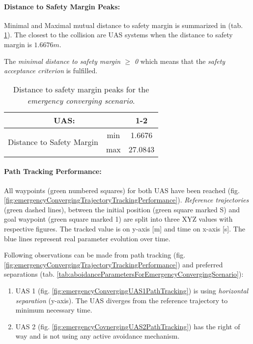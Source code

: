 \paragraph{Distance to Safety Margin Peaks:} Minimal and Maximal mutual distance to safety margin is summarized in (tab. \ref{tab:testCaseEmergencyConvergingSafetyMarginDistances}). The closest to the collision are UAS systems when the distance to safety margin is $1.6676m$.

The \emph{minimal distance to safety margin  $\ge$ 0} which means that the \emph{safety acceptance criterion} is fulfilled. 

\begin{table}[H]
    \centering
    \begin{tabular}{c|c||c}
    \multicolumn{2}{c||}{UAS:} & 1-2 \\\hline\hline
    \multirow{2}{*}{Distance to Safety Margin} & min & 1.6676 \\\cline{2-3}
                                            & max & 27.0843 \\
    \end{tabular}
    \caption{Distance to safety margin peaks for the \emph{emergency converging scenario}.}
    \label{tab:testCaseEmergencyConvergingSafetyMarginDistances}
\end{table}

\paragraph{Path Tracking Performance:} All waypoints (green numbered squares) for both  UAS have been reached (fig. \ref{fig:emergencyConvergingTrajectoryTrackingPerformance}). \emph{Reference trajectories} (green dashed lines), between the initial position (green square marked S) and goal waypoint (green square marked 1) are split into three XYZ values with respective figures. The tracked value is on y-axis [m] and time on x-axis [s]. The blue lines represent real parameter evolution over time.

Following observations can be made from path tracking (fig. \ref{fig:emergencyConvergingTrajectoryTrackingPerformance}) and preferred separations (tab. \ref{tab:aboidanceParametersForEmergencyConvergingScenario}):

\begin{enumerate}
    \item UAS 1 (fig. \ref{fig:emergencyConvergingUAS1PathTracking}) is using \emph{horizontal separation} (y-axis). The UAS diverges from the reference trajectory to minimum necessary time.
    
    \item UAS 2 (fig. \ref{fig:emergencyCovnergingUAS2PathTracking}) has the right of way and is not using any active avoidance mechanism. 
\end{enumerate}

